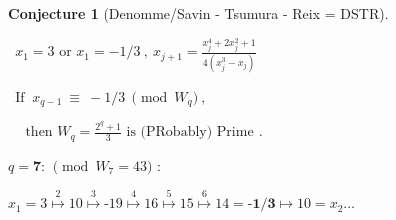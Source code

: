 \documentclass[latin1]{quadrature}
\newcommand{\PMod}[1]{\!\!\pmod{#1}}
\newtheorem{conjecture}{Conjecture}
\newif\ifenfrancais
\begin{document}
\begin{article}
\begin{article}
\ifenfrancais
\begin{conjecture}[Denomme/Savin - Tsumura - Reix = DSTR]
\ 

\vspace{-.05in}
\quad \  $x_1=3 \text{ ou } x_1=-1/3 \ , \   x_{j+1} = \frac{\displaystyle x_j^4+2x_j^2+1}{\displaystyle 4(x_j^3-x_j)}$

\vspace{.05in}
\quad \  $\text{Si } \ x_{q-1} \  \equiv \ -1/3 \ \pmod{W_q} \ ,$

\vspace{.05in}
\quad \ \ $ \ \text{alors } W_q = \frac{2^q+1}{3} \text{ est (PRobablement) Premier}$ .

\end{conjecture}
\else
\begin{conjecture}[Denomme/Savin - Tsumura - Reix = DSTR]
\ 

\vspace{-.05in}
\quad \  $x_1=3 \text{ or } x_1=-1/3  \ , \   x_{j+1} = \frac{\displaystyle x_j^4+2x_j^2+1}{\displaystyle 4(x_j^3-x_j)}$

\vspace{.05in}
\quad \  $\text{If } \ x_{q-1} \  \equiv \ -1/3 \ \pmod{W_q} \ ,$

\vspace{.05in}
\quad \ \ $ \ \text{then } W_q = \frac{2^q+1}{3} \text{ is (PRobably) Prime}$ .

\end{conjecture}
\fi



%	



\vspace{.05in}

$q=\textbf{7}$: $\PMod{W_{7}=43}$ :

$x_1 = 3
\stackrel{2}{\mapsto} \text{10}
\stackrel{3}{\mapsto} \text{-19}
\stackrel{4}{\mapsto} \text{16}
\stackrel{5}{\mapsto} \text{15}
\stackrel{6}{\mapsto} \text{14} = \textbf{-1/3}
\stackrel{}{\mapsto} \text{10} = x_2 \dots $


\end{article}
\end{article}
\end{document}
